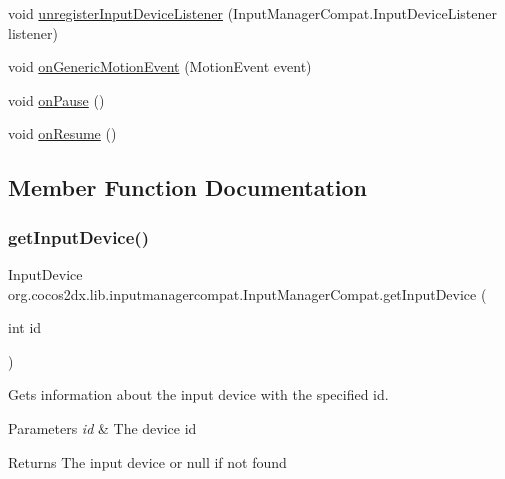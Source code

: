 \begin{DoxyCompactItemize}
void \hyperlink{interfaceorg_1_1cocos2dx_1_1lib_1_1inputmanagercompat_1_1InputManagerCompat_a3f2a57f29caa18f703e3d38f7f080ba9}{unregister\+Input\+Device\+Listener} (Input\+Manager\+Compat.\+Input\+Device\+Listener listener)
\item 
void \hyperlink{interfaceorg_1_1cocos2dx_1_1lib_1_1inputmanagercompat_1_1InputManagerCompat_a813a0308659d716c9503d44ccb48ebb1}{on\+Generic\+Motion\+Event} (Motion\+Event event)
\item 
void \hyperlink{interfaceorg_1_1cocos2dx_1_1lib_1_1inputmanagercompat_1_1InputManagerCompat_a75e607a2bc756ca935665236f995dd0e}{on\+Pause} ()
\item 
void \hyperlink{interfaceorg_1_1cocos2dx_1_1lib_1_1inputmanagercompat_1_1InputManagerCompat_a8ce6170ffd23cf2a18374c271939ac1e}{on\+Resume} ()
\end{DoxyCompactItemize}


\subsection{Member Function Documentation}
\mbox{\label{interfaceorg_1_1cocos2dx_1_1lib_1_1inputmanagercompat_1_1InputManagerCompat_afbfb5229b12433c81ddbf9e0315cd986}} 
\subsubsection{\texorpdfstring{get\+Input\+Device()}{getInputDevice()}\hspace{0.1cm}{\footnotesize\ttfamily [1/2]}}
{\footnotesize\ttfamily Input\+Device org.\+cocos2dx.\+lib.\+inputmanagercompat.\+Input\+Manager\+Compat.\+get\+Input\+Device (\begin{DoxyParamCaption}\item[{int}]{id }\end{DoxyParamCaption})}

Gets information about the input device with the specified id.


\begin{DoxyParams}{Parameters}
{\em id} & The device id \\
\hline
\end{DoxyParams}
\begin{DoxyReturn}{Returns}
The input device or null if not found 
\end{DoxyReturn}


